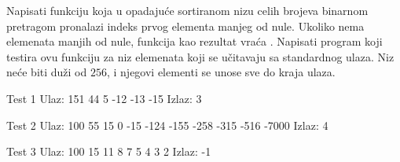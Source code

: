 \begin{Exercise}[label=408]
Napisati funkciju koja u opadajuće sortiranom nizu celih brojeva
binarnom pretragom pronalazi indeks prvog elementa manjeg od nule. Ukoliko nema elemenata
manjih od nule, funkcija kao rezultat vraća . Napisati
program koji testira ovu funkciju za niz elemenata koji se
učitavaju sa standardnog ulaza. Niz neće biti duži od
$256$, i njegovi elementi se unose sve do kraja ulaza.

\begin{miditest}
\begin{test}{Test 1}
Ulaz:  151 44 5 -12 -13 -15
Izlaz: 3
\end{test}
\end{miditest}
\begin{miditest}
\begin{test}{Test 2}
Ulaz:  100 55 15 0 -15 -124 -155 
       -258 -315 -516 -7000
Izlaz: 4
\end{test}
\end{miditest}

\begin{miditest}
\begin{test}{Test 3}
Ulaz:  100 15 11 8 7 5 4 3 2
Izlaz: -1
\end{test}
\end{miditest}


\end{Exercise}


